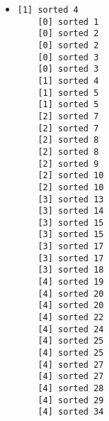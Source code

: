 \documentclass[a4paper]{article}
\begin{document}
\begin{figure}[!hbt]
\begin{itemize}
\item[] \begin{lstlisting}[style=mycpp, label=lst:5-t, caption=5线程结果]
    [1] sorted 4
    [0] sorted 1
    [0] sorted 2
    [0] sorted 2
    [0] sorted 3
    [0] sorted 3
    [1] sorted 4
    [1] sorted 5
    [1] sorted 5
    [2] sorted 7
    [2] sorted 7
    [2] sorted 8
    [2] sorted 8
    [2] sorted 9
    [2] sorted 10
    [2] sorted 10
    [3] sorted 13
    [3] sorted 14
    [3] sorted 15
    [3] sorted 15
    [3] sorted 17
    [3] sorted 17
    [3] sorted 18
    [4] sorted 19
    [4] sorted 20
    [4] sorted 20
    [4] sorted 22
    [4] sorted 24
    [4] sorted 25
    [4] sorted 25
    [4] sorted 27
    [4] sorted 27
    [4] sorted 28
    [4] sorted 29
    [4] sorted 34
\end{lstlisting}
\end{itemize}
\end{figure}


\end{document}
